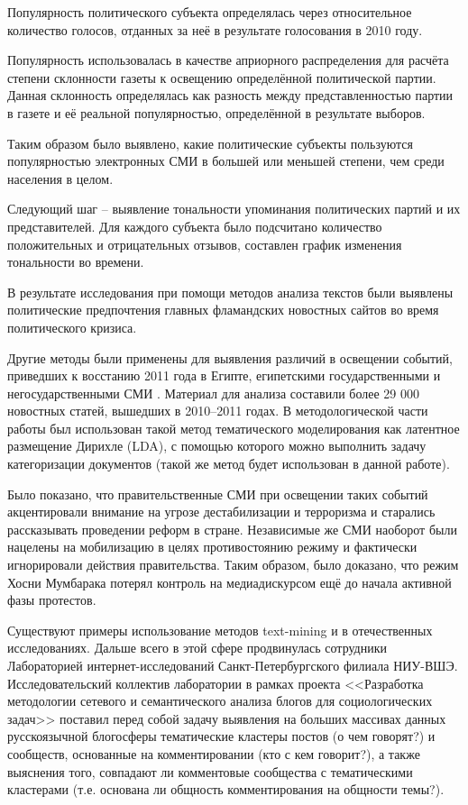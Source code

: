 Популярность политического субъекта определялась через относительное количество голосов, отданных за неё в результате голосования в 2010 году.

Популярность использовалась в качестве априорного распределения для расчёта степени склонности газеты к освещению определённой политической партии. Данная склонность определялась как разность между представленностью партии в газете и её реальной популярностью, определённой в результате выборов.

Таким образом было выявлено, какие политические субъекты пользуются популярностью электронных СМИ в большей или меньшей степени, чем среди населения в целом.

Следующий шаг -- выявление тональности упоминания политических партий и их представителей. Для каждого субъекта было подсчитано количество положительных и отрицательных отзывов, составлен график изменения тональности во времени.

В результате исследования при помощи методов анализа текстов были выявлены политические предпочтения главных фламандских новостных сайтов во время политического кризиса.

Другие методы были применены для выявления различий в освещении событий, приведших к восстанию 2011 года в Египте, египетскими государственными и негосударственными СМИ \cite{EgyptianUprising2012}. Материал для анализа составили более 29 000 новостных статей, вышедших в 2010--2011 годах. В методологической части работы был использован такой метод тематического моделирования как латентное размещение Дирихле (LDA), с помощью которого можно выполнить задачу категоризации документов (такой же метод будет использован в данной работе).

Было показано, что правительственные СМИ при освещении таких событий акцентировали внимание на угрозе дестабилизации и терроризма и старались рассказывать проведении реформ в стране. Независимые же СМИ наоборот были нацелены на мобилизацию в целях противостоянию режиму и фактически игнорировали действия правительства. Таким образом, было доказано, что режим Хосни Мумбарака потерял контроль на медиадискурсом ещё до начала активной фазы протестов.

Существуют примеры использование методов text-mining и в отечественных исследованиях. Дальше всего в этой сфере продвинулась сотрудники Лабораторией интернет-исследований Санкт-Петербургского филиала НИУ-ВШЭ. Исследовательский коллектив лаборатории в рамках проекта <<Разработка методологии сетевого и семантического анализа блогов для социологических задач>> поставил перед собой задачу выявления на больших массивах данных русскоязычной блогосферы тематические кластеры постов (о чем говорят?) и сообществ, основанные на комментировании (кто с кем говорит?), а также выяснения того, совпадают ли комментовые сообщества с тематическими кластерами (т.е. основана ли общность комментирования на общности темы?).


